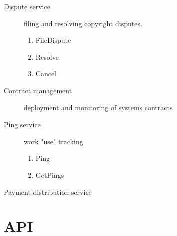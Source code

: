 \documentclass[12pt]{article}
\begin{document}
\begin{description}
\begin{enumerate}
			\end{enumerate}
		\item[Dispute service] filing and resolving copyright disputes.
			\begin{enumerate}
				\item FileDispute
				\item Resolve
				\item Cancel
			\end{enumerate}
		\item[Contract management] deployment and monitoring of systems contracts
		\item[Ping service] work "use" tracking
			\begin{enumerate}
				\item Ping
				\item GetPings
			\end{enumerate}
	\end{description}
	
	\begin{description}
		\item[Payment distribution service]	
	\end{description}

	\section{API}
	
\end{document}
